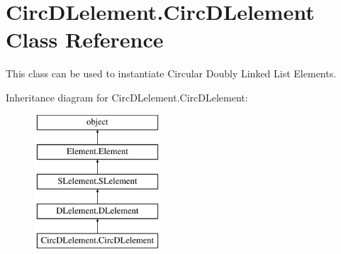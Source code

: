 \hypertarget{class_circ_d_lelement_1_1_circ_d_lelement}{}\section{Circ\+D\+Lelement.\+Circ\+D\+Lelement Class Reference}
\label{class_circ_d_lelement_1_1_circ_d_lelement}


This class can be used to instantiate Circular Doubly Linked List Elements.  


Inheritance diagram for Circ\+D\+Lelement.\+Circ\+D\+Lelement\+:\begin{figure}[H]
\begin{center}
\leavevmode
\includegraphics[height=5.000000cm]{class_circ_d_lelement_1_1_circ_d_lelement}
\end{center}
\end{figure}
